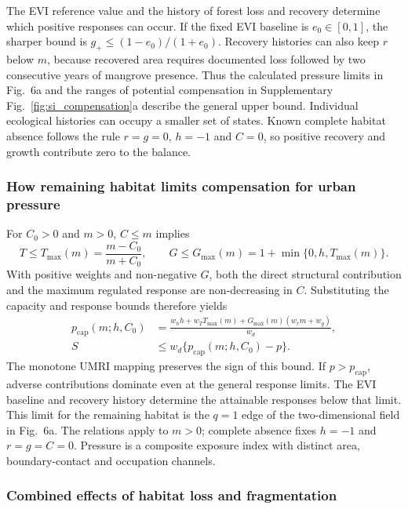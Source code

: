The EVI reference value and the history of forest loss and recovery determine which positive responses can occur. If the fixed EVI baseline is $e_0\in[0,1]$, the sharper bound is $g_+\leq(1-e_0)/(1+e_0)$. Recovery histories can also keep $r$ below $m$, because recovered area requires documented loss followed by two consecutive years of mangrove presence. Thus the calculated pressure limits in Fig.~6a and the ranges of potential compensation in Supplementary Fig.~\ref{fig:si_compensation}a describe the general upper bound. Individual ecological histories can occupy a smaller set of states. Known complete habitat absence follows the rule $r=g=0$, $h=-1$ and $C=0$, so positive recovery and growth contribute zero to the balance.

\subsubsection{How remaining habitat limits compensation for urban pressure}
For $C_0>0$ and $m>0$, $C\leq m$ implies
\[
T\leq T_{\max}(m)=\frac{m-C_0}{m+C_0},\qquad
G\leq G_{\max}(m)=1+\min\{0,h,T_{\max}(m)\}.
\]
With positive weights and non-negative $G$, both the direct structural contribution and the maximum regulated response are non-decreasing in $C$. Substituting the capacity and response bounds therefore yields
\[
\begin{aligned}
p_{\mathrm{cap}}(m;h,C_0)&=
\frac{w_hh+w_TT_{\max}(m)+G_{\max}(m)(w_rm+w_g)}{w_d},\\
S&\leq w_d\{p_{\mathrm{cap}}(m;h,C_0)-p\}.
\end{aligned}
\]
The monotone UMRI mapping preserves the sign of this bound. If $p>p_{\mathrm{cap}}$, adverse contributions dominate even at the general response limits. The EVI baseline and recovery history determine the attainable responses below that limit. This limit for the remaining habitat is the $q=1$ edge of the two-dimensional field in Fig.~6a. The relations apply to $m>0$; complete absence fixes $h=-1$ and $r=g=C=0$. Pressure is a composite exposure index with distinct area, boundary-contact and occupation channels.

\subsubsection{Combined effects of habitat loss and fragmentation}

